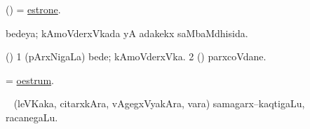 \bentry
{}
\gl{\nA}
\bmng
(\birx) = \hyperref{kandict_e.pdf}{E}{estrone}{estrone}. 
\emng
\eentry

\bentry
{}
\gl{\gu}
\bmng
bedeya; kAmoVderxVkada yA adakekx saMbaMdhisida. 
\emng
\eentry

\bentry
{}
\gl{\nA}
\bmng
(\birx) 
\bnum
\num{1} (pArxNigaLa) bede; kAmoVderxVka. 
\num{2} (\pArxparx) parxcoVdane. 
\enum
\emng
\eentry

\bentry
{}
\gl{\nA}
\bmng
= \hyperlink{oestrum}{oestrum}. 
\emng
\eentry

\bentry
{}
\gl{\nA}\F\
\bmng
(leVKaka, citarxkAra, vAgegxVyakAra, \mo vara) samagarx--kaqtigaLu, racanegaLu. 
\emng
\eentry

